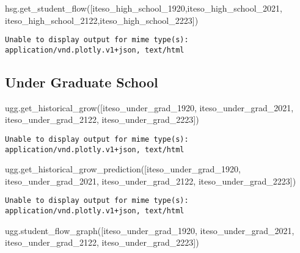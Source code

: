 \documentclass[
  letterpaper,
  DIV=11,
  numbers=noendperiod]{scrartcl}
\newenvironment{Shaded}{\begin{snugshade}}{\end{snugshade}}
\newcommand{\NormalTok}[1]{\textcolor[rgb]{0.00,0.23,0.31}{#1}}
\begin{document}
\begin{Shaded}
\begin{Highlighting}[]
\NormalTok{hsg.get\_student\_flow([iteso\_high\_school\_1920,iteso\_high\_school\_2021, }
\NormalTok{                        iteso\_high\_school\_2122,iteso\_high\_school\_2223])}
\end{Highlighting}
\end{Shaded}

\begin{verbatim}
Unable to display output for mime type(s): application/vnd.plotly.v1+json, text/html
\end{verbatim}

\subsection{Under Graduate School}\label{under-graduate-school-1}

\begin{Shaded}
\begin{Highlighting}[]
\NormalTok{ugg.get\_historical\_grow([iteso\_under\_grad\_1920, iteso\_under\_grad\_2021, iteso\_under\_grad\_2122, iteso\_under\_grad\_2223])}
\end{Highlighting}
\end{Shaded}

\begin{verbatim}
Unable to display output for mime type(s): application/vnd.plotly.v1+json, text/html
\end{verbatim}

\begin{Shaded}
\begin{Highlighting}[]
\NormalTok{ugg.get\_historical\_grow\_prediction([iteso\_under\_grad\_1920, iteso\_under\_grad\_2021, }
\NormalTok{                                    iteso\_under\_grad\_2122, iteso\_under\_grad\_2223])}
\end{Highlighting}
\end{Shaded}

\begin{verbatim}
Unable to display output for mime type(s): application/vnd.plotly.v1+json, text/html
\end{verbatim}

\begin{Shaded}
\begin{Highlighting}[]
\NormalTok{ugg.student\_flow\_graph([iteso\_under\_grad\_1920, iteso\_under\_grad\_2021, iteso\_under\_grad\_2122, iteso\_under\_grad\_2223])}
\end{Highlighting}
\end{Shaded}
\end{document}
